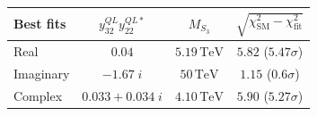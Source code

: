 \documentclass[mathserif, 10pt]{beamer}
\begin{document}
\begin{frame}
    \begin{table}
        \centering
        \begin{tabular}{|l|c|c|c|}\hline
            \textbf{Best fits} & $y^{QL}_{32} y^{QL*}_{22}$ & $M_{S_3}$            & $\sqrt{\chi^2_\mathrm{SM} - \chi^2_\mathrm{fit}}$ \\\hline
            Real               & $ 0.04 $                   & $5.19\,\mathrm{TeV}$ & $5.82$ \quad (\alert{$5.47\sigma$})               \\\hline
            Imaginary          & $-1.67\;i$                 & $50\,\mathrm{TeV}$   & $1.15$ \quad (\alert{$0.6\sigma$})                \\\hline
            Complex            & $0.033+0.034\;i$           & $4.10\,\mathrm{TeV}$ & $5.90$ \quad (\alert{$5.27\sigma$})               \\\hline
        \end{tabular}
    \end{table}

\end{frame}
\end{document}
